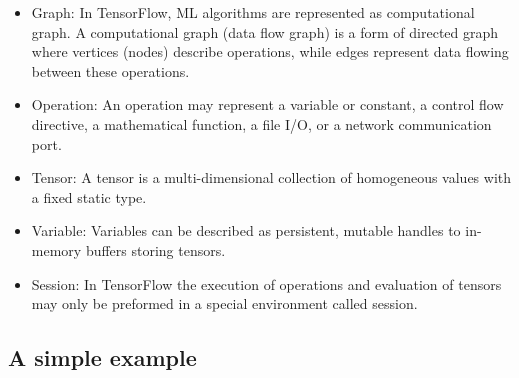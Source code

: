 \documentclass[11pt, oneside]{article}   	%
\begin{document}
\begin{itemize}

\item Graph: In TensorFlow, ML algorithms are represented as computational graph. A computational graph (data flow graph) is a form of directed graph where vertices (nodes) describe operations, while edges represent data flowing between these operations.
	  	
\item Operation: An operation may represent a variable or constant, a control flow directive, a mathematical function, a file I/O, or a network communication port.
	  	
\item Tensor: A tensor is a multi-dimensional collection of homogeneous values with a fixed static type.
	  	
\item Variable: Variables can be described as persistent, mutable handles to in-memory buffers storing tensors.
	  	
\item Session: In TensorFlow the execution of operations and evaluation of tensors may only be preformed in a special environment called session.
	  	
\end{itemize}

\subsection{A simple example}
\end{document}
